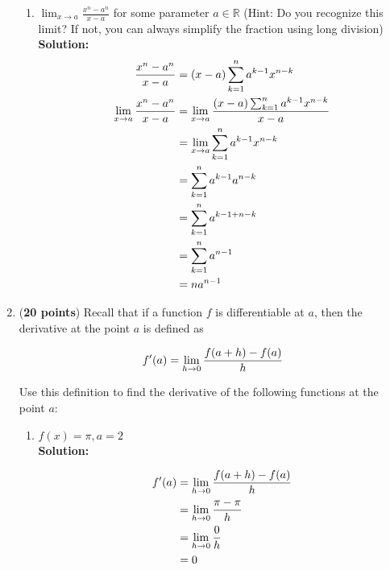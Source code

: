 \documentclass[a4paper]{article}
\begin{document}
\begin{enumerate}
\begin{enumerate}
	
	\item $\lim_{x \to a} \frac{x^n - a^n}{x - a}$ for some parameter $a \in \mathbb{R}$ (Hint: Do you recognize this limit? If not, you can always simplify the fraction using long division)\\
	\textbf{Solution:}\\
	

\begin{align}
\frac{x^n - a^n}{x - a} &= (x-a) \sum_{k=1}^{n}a^{k-1}x^{n-k}\notag\\
\lim_{x \to a} \frac{x^n - a^n}{x - a} &= \lim_{x \to a} \frac{(x-a) \sum_{k=1}^{n}a^{k-1}x^{n-k}}{x - a}\notag\\ 
&= \lim_{x \to a} \sum_{k=1}^{n}a^{k-1}x^{n-k}\notag\\
&= \sum_{k=1}^{n}a^{k-1}a^{n-k}\notag\\
&= \sum_{k=1}^{n}a^{k-1+n-k}\notag\\
&= \sum_{k=1}^{n}a^{n-1}\notag\\
&= na^{n-1}\notag
\end{align}

\end{enumerate}


\item (\textbf{20 points}) Recall that if a function $f$ is differentiable at $a$, then the derivative at the point $a$ is defined as 

\begin{equation}
	f'(a) = \lim_{h \to 0} \frac{f(a + h) - f(a)}{h} \notag
\end{equation}

Use this definition to find the derivative of the following functions at the point $a$:

\begin{enumerate}
	\item $f(x) = \pi, a = 2$\\
	\textbf{Solution:}\\
	
	
\begin{align}
	f'(a) &= \lim_{h \to 0} \frac{f(a + h) - f(a)}{h}\notag\\
	&= \lim_{h \to 0} \frac{\pi - \pi}{h}\notag\\
	&= \lim_{h \to 0} \frac{0}{h}\notag\\
	&= 0\notag
\end{align}		
	

\end{enumerate}
\end{enumerate}
\end{document}
